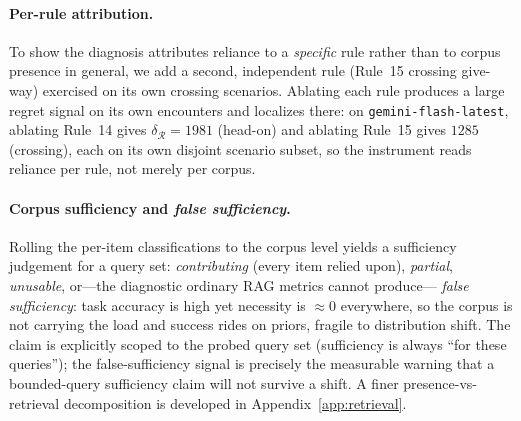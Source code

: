 \documentclass{article}
\newcommand{\regret}{\mathcal{R}}
\begin{document}
\paragraph{Per-rule attribution.} To show the diagnosis attributes reliance to a \emph{specific} rule
rather than to corpus presence in general, we add a second, independent rule (Rule~15 crossing
give-way) exercised on its own crossing scenarios. Ablating each rule produces a large regret signal on
its own encounters and localizes there: on \texttt{gemini-flash-latest}, ablating Rule~14 gives
$\delta_{\!\regret}{=}1981$ (head-on) and ablating Rule~15 gives $1285$ (crossing), each on its own
disjoint scenario subset, so the instrument reads reliance per rule, not merely per corpus.

\paragraph{Corpus sufficiency and \emph{false sufficiency}.} Rolling the per-item classifications to the
corpus level yields a sufficiency judgement for a query set: \emph{contributing} (every item relied
upon), \emph{partial}, \emph{unusable}, or---the diagnostic ordinary RAG metrics cannot produce---%
\emph{false sufficiency}: task accuracy is high yet necessity is $\approx\!0$ everywhere, so the corpus
is not carrying the load and success rides on priors, fragile to distribution shift. The claim is
explicitly scoped to the probed query set (sufficiency is always ``for these queries''); the
false-sufficiency signal is precisely the measurable warning that a bounded-query sufficiency claim
will not survive a shift. A finer presence-vs-retrieval decomposition is developed in
Appendix~\ref{app:retrieval}.
\end{document}
